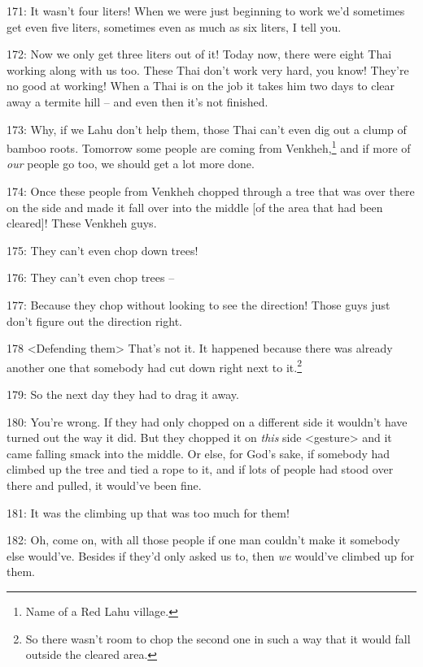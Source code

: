 171: It wasn't four liters! When we were just beginning to work we'd sometimes
get even five liters, sometimes even as much as six liters, I tell you.

172: Now we only get three liters out of it! Today now, there were eight Thai working
along with us too. These Thai don't work very hard, you know! They're no good at
working! When a Thai is on the job it takes him two days to clear away a termite
hill -- and even then it's not finished.

173: Why, if we Lahu don't help them, those Thai can't even dig out a clump of
bamboo roots. Tomorrow some people are coming from Venkheh,\footnote{Name of a Red Lahu village.} and if more of
\textit{our} people go too, we should get a lot more done.

174: Once these people from Venkheh chopped through a tree that was over there
on the side and made it fall over into the middle [of the area that had been cleared]!
These Venkheh guys.

175: They can't even chop down trees!

176: They can't even chop trees --

177: Because they chop without looking to see the direction! Those guys just don't
figure out the direction right.

178 <Defending them> That's not it. It happened because there
was already another one that somebody had cut down right next to it.\footnote{So there wasn't room to chop the second one in such a way that it would fall outside the cleared area.}

179: So the next day they had to drag it away.

180: You're wrong. If they had only chopped on a different side it wouldn't have
turned out the way it did. But they chopped it on \textit{this} side <gesture>
and it came falling smack into the middle. Or else, for God's sake, if somebody
had climbed up the tree and tied a rope to it, and if lots of people had stood
over there and pulled, it would've been fine.

181: It was the climbing up that was too much for them!

182: Oh, come on, with all those people if one man couldn't make it somebody else
would've. Besides if they'd only asked us to, then \textit{we} would've climbed
up for them.


